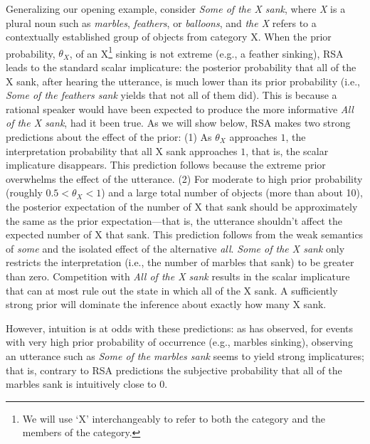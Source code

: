 \documentclass[10pt,letterpaper]{article}
\begin{document}
Generalizing our opening example, consider \emph{Some of the X sank}, where \emph{X} is a plural noun such as \emph{marbles}, \emph{feathers}, or \emph{balloons}, and \emph{the X} refers to a contextually established group of objects from category X. When the prior probability, $\theta_{X}$, of an X\footnote{We will use `X' interchangeably to refer to both the category and the members of the category.} sinking is not extreme (e.g., a feather sinking), RSA leads to the standard scalar implicature: the posterior probability that all of the X sank, after hearing the utterance, is much lower than its prior probability (i.e., \emph{Some of the feathers sank} yields that not all of them did). This is because a rational speaker would have been expected to produce the more informative \emph{All of the X sank}, had it been true.
As we will show below, RSA makes two strong predictions about the effect of the prior: (1) As $\theta_{X}$ approaches $1$, the interpretation probability that all X sank approaches $1$, that is, the scalar implicature disappears. 
This prediction follows because the extreme prior overwhelms the effect of the utterance.
(2) For moderate to high prior probability (roughly $0.5{<}\theta_{X}{<}1$) and a large total number of objects (more than about 10), the posterior expectation of the number of X that sank should be approximately the same as the prior expectation---that is, the utterance shouldn't affect the expected number of X that sank. 
%
This prediction follows from the weak semantics of \emph{some} and the isolated effect of the alternative \emph{all}. \emph{Some of the X sank} only restricts the interpretation (i.e., the number of marbles that sank) to be greater than zero. Competition with \emph{All of the X sank} results in the scalar implicature that can at most rule out the state in which all of the X sank. A sufficiently strong prior will dominate the inference about exactly how many X sank.




However, intuition is at odds with these predictions: as  has observed, for events with very high prior probability of occurrence (e.g., marbles sinking), observing an utterance such as \emph{Some of the marbles sank} seems to yield strong implicatures; that is, contrary to RSA predictions the subjective probability that all of the marbles sank is intuitively close to 0. 
%
\end{document}
